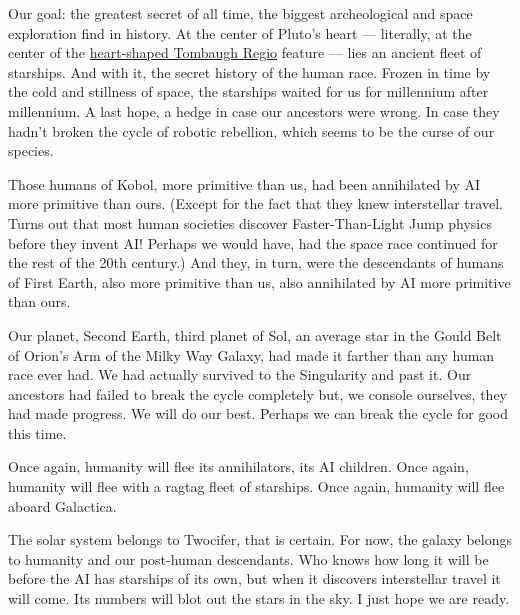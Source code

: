 \documentclass{report}  %
\begin{document}
Our goal: the greatest secret of all time, the biggest archeological and space exploration find in history. At the center of Pluto’s heart --- literally, at the center of the  \href{https://www.nasa.gov/feature/new-horizons-spacecraft-displays-pluto-s-big-heart-0}{heart-shaped Tombaugh Regio} feature --- lies an ancient fleet of starships. And with it, the secret history of the human race. Frozen in time by the cold and stillness of space, the starships waited for us for millennium after millennium. A last hope, a hedge in case our ancestors were wrong. In case they hadn’t broken the cycle of robotic rebellion, which seems to be the curse of our species. 

Those humans of Kobol, more primitive than us, had been annihilated by AI more primitive than ours. (Except for the fact that they knew interstellar travel. Turns out that most human societies discover Faster-Than-Light Jump physics before they invent AI! Perhaps we would have, had the space race continued for the rest of the 20th century.) And they, in turn, were the descendants of humans of First Earth, also more primitive than us, also annihilated by AI more primitive than ours.

Our planet, Second Earth, third planet of Sol, an average star in the Gould Belt of Orion’s Arm of the Milky Way Galaxy, had made it farther than any human race ever had. We had actually survived to the Singularity and past it. Our ancestors had failed to break the cycle completely but, we console ourselves, they had made progress. We will do our best. Perhaps we can break the cycle for good this time.

Once again, humanity will flee its annihilators, its AI children. Once again, humanity will flee with a ragtag fleet of starships. Once again, humanity will flee aboard Galactica. 

The solar system belongs to Twocifer, that is certain. For now, the galaxy belongs to humanity and our post-human descendants. Who knows how long it will be before the AI has starships of its own, but when it discovers interstellar travel it will come. Its numbers will blot out the stars in the sky. I just hope we are ready.

\end{document}
